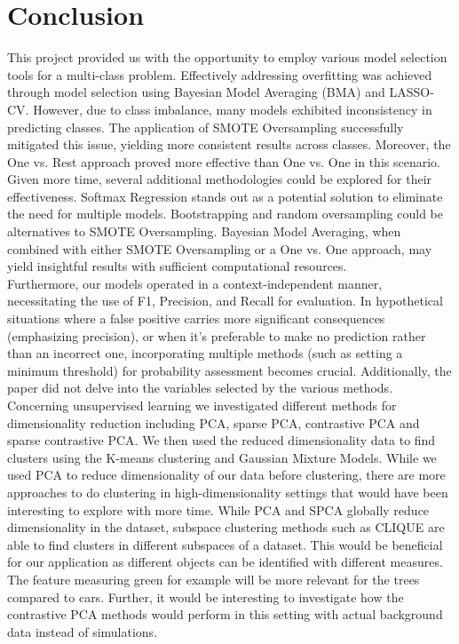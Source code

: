 \documentclass[11pt]{article}
\begin{document}
\section{Conclusion}
This project provided us with the opportunity to employ various model selection tools for a multi-class problem. Effectively addressing overfitting was achieved through model selection using Bayesian Model Averaging (BMA) and LASSO-CV. However, due to class imbalance, many models exhibited inconsistency in predicting classes. The application of SMOTE Oversampling successfully mitigated this issue, yielding more consistent results across classes. Moreover, the One vs. Rest approach proved more effective than One vs. One in this scenario.\\

Given more time, several additional methodologies could be explored for their effectiveness. Softmax Regression stands out as a potential solution to eliminate the need for multiple models. Bootstrapping and random oversampling could be alternatives to SMOTE Oversampling. Bayesian Model Averaging, when combined with either SMOTE Oversampling or a One vs. One approach, may yield insightful results with sufficient computational resources.\\

Furthermore, our models operated in a context-independent manner, necessitating the use of F1, Precision, and Recall for evaluation. In hypothetical situations where a false positive carries more significant consequences (emphasizing precision), or when it's preferable to make no prediction rather than an incorrect one, incorporating multiple methods (such as setting a minimum threshold) for probability assessment becomes crucial. Additionally, the paper did not delve into the variables selected by the various methods. \\

Concerning unsupervised learning we investigated different methods for dimensionality reduction including PCA, sparse PCA, contrastive PCA and sparse contrastive PCA. We then used the reduced dimensionality data to find clusters using the K-means clustering and Gaussian Mixture Models. While we used PCA to reduce dimensionality of our data before clustering, there are more approaches to do clustering in high-dimensionality settings that would have been interesting to explore with more time. While PCA and SPCA globally reduce dimensionality in the dataset, subspace clustering methods such as CLIQUE are able to find clusters in different subspaces of a dataset. This would be beneficial for our application as different objects can be identified with different measures. The feature measuring green for example will be more relevant for the trees compared to cars. Further, it would be interesting to investigate how the contrastive PCA methods would perform in this setting with actual background data instead of simulations.
\end{document}
